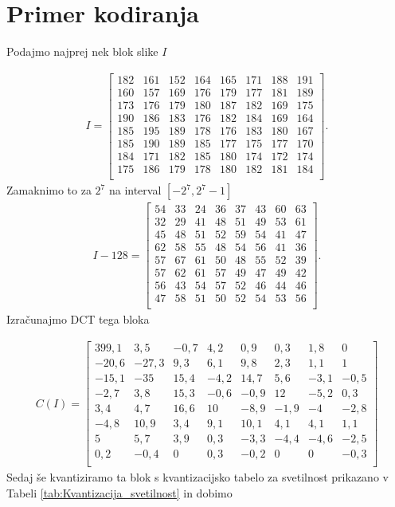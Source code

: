 \documentclass[a4paper,12pt,openright]{book}
\begin{document}
\section{Primer kodiranja}\label{Primer_kodiranja}
Podajmo najprej nek blok slike $I$

\begin{gather*}
 I =
  \begin{bmatrix}
 182& 161& 152& 164& 165& 171& 188& 191\\
 160& 157& 169& 176& 179& 177& 181& 189\\
 173& 176& 179& 180& 187& 182& 169& 175\\
 190& 186& 183& 176& 182& 184& 169& 164\\
 185& 195& 189& 178& 176& 183& 180& 167\\
 185& 190& 189& 185& 177& 175& 177& 170\\
 184& 171& 182& 185& 180& 174& 172& 174\\
 175& 186& 179& 178& 180& 182& 181& 184\\
   \end{bmatrix}.
\end{gather*}
Zamaknimo to za $2^7$ na interval $\left[-2^{7},2^{7}-1\right]$
\begin{gather*}
 I - 128 =
  \begin{bmatrix}
  54& 33& 24& 36& 37& 43& 60& 63\\
  32& 29& 41& 48& 51& 49& 53& 61\\
  45& 48& 51& 52& 59& 54& 41& 47\\
  62& 58& 55& 48& 54& 56& 41& 36\\
  57& 67& 61& 50& 48& 55& 52& 39\\
  57& 62& 61& 57& 49& 47& 49& 42\\
  56& 43& 54& 57& 52& 46& 44& 46\\
  47& 58& 51& 50& 52& 54& 53& 56\\
   \end{bmatrix}.
\end{gather*}
Izračunajmo DCT tega bloka

\begin{gather*}
 C(I) =
  \begin{bmatrix}
 399,1&   3,5&  -0,7&   4,2&   0,9&   0,3&   1,8&   0 \\
 -20,6& -27,3&   9,3&   6,1&   9,8&   2,3&   1,1&   1 \\
 -15,1& -35 &  15,4&  -4,2&  14,7&   5,6&  -3,1&  -0,5\\
  -2,7&   3,8&  15,3&  -0,6&  -0,9&  12 &  -5,2&   0,3\\
   3,4&   4,7&  16,6&  10 &  -8,9&  -1,9&  -4 &  -2,8\\
  -4,8&  10,9&   3,4&   9,1&  10,1&   4,1&   4,1&   1,1\\
   5 &   5,7&   3,9&   0,3&  -3,3&  -4,4&  -4,6&  -2,5\\
   0,2&  -0,4&  0 &   0,3&  -0,2&  0 &  0 &  -0,3\\
   \end{bmatrix}
\end{gather*}
Sedaj še kvantiziramo ta blok s kvantizacijsko tabelo za svetilnost prikazano v Tabeli \ref{tab:Kvantizacija_svetilnost} in dobimo
\end{document}
